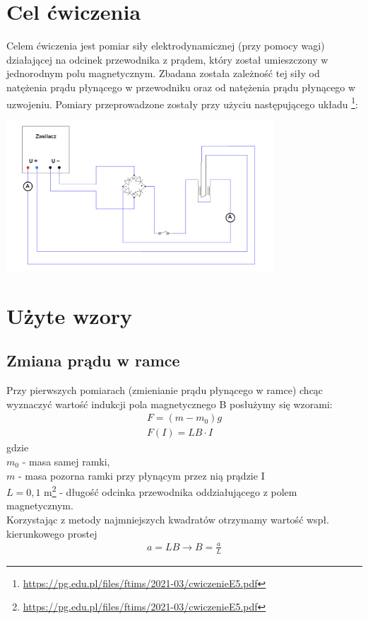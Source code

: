 \documentclass{article}
\begin{document}
\section{Cel ćwiczenia}
Celem ćwiczenia jest pomiar siły elektrodynamicznej (przy pomocy wagi) działającej na odcinek przewodnika z prądem, który został umieszczony w jednorodnym polu magnetycznym. Zbadana została zależność tej siły od natężenia prądu płynącego w przewodniku oraz od natężenia prądu płynącego w uzwojeniu. Pomiary przeprowadzone zostały przy użyciu następującego układu \footnote{\url{https://pg.edu.pl/files/ftims/2021-03/cwiczenieE5.pdf}}:
\begin{center}
\includegraphics[width=10cm]{aaa}
\end{center}
\section{Użyte wzory}

\subsection{Zmiana prądu w ramce}
Przy pierwszych pomiarach (zmienianie prądu płynącego w ramce) chcąc wyznaczyć 
wartość indukcji pola magnetycznego B posłużymy się wzorami:
\begin{gather*}
	F = (m-m_0)g \\
	F(I) = LB \cdot I
\end{gather*} 
gdzie \\ $m_0$ - masa samej ramki,\\
$m$ - masa pozorna ramki przy płynącym przez nią prądzie I \\
$L=0,1$ m\footnote{\url{https://pg.edu.pl/files/ftims/2021-03/cwiczenieE5.pdf}} - długość odcinka przewodnika oddziałującego z polem magnetycznym. \\
Korzystając z metody najmniejszych kwadratów otrzymamy wartość wspł.  kierunkowego prostej
\begin{gather*}
	a = LB \rightarrow B = \frac{a}{L}
\end{gather*}
\end{document}
